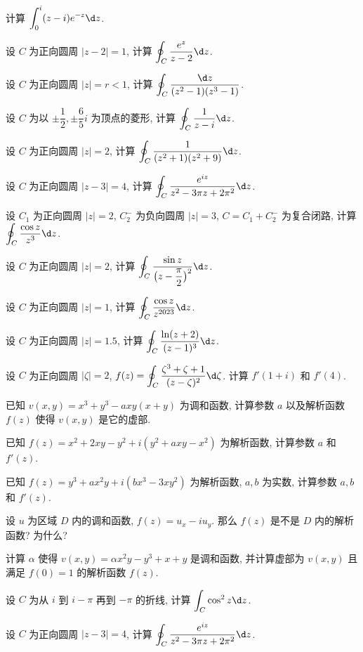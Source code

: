 \begin{homework}
\begin{subex}
    \item 计算 $\displaystyle\int_0^i(z-i)e^{-z}\d z$.
    \item 设 $C$ 为正向圆周 $|z-2|=1$, 计算 
      $\displaystyle\oint_C\frac{e^z}{z-2}\d z$.
    \item 设 $C$ 为正向圆周 $|z|=r<1$, 计算 
      $\displaystyle\oint_C\frac{\d z}{(z^2-1)(z^3-1)}$.
    \item 设 $C$ 为以 $\pm\dfrac12,\pm\dfrac65i$ 为顶点的菱形, 计算 
      $\displaystyle\oint_C\frac{1}{z-i}\d z$.
    \item 设 $C$ 为正向圆周 $|z|=2$, 计算 
      $\displaystyle\oint_C\frac1{(z^2+1)(z^2+9)}\d z$.
    \item 设 $C$ 为正向圆周 $|z-3|=4$, 计算 
      $\displaystyle\oint_C\frac{e^{iz}}{z^2-3\pi z+2\pi^2}\d z$.
    \item 设 $C_1$ 为正向圆周 $|z|=2$, $C_2^-$ 为负向圆周 $|z|=3$, $C=C_1+C_2^-$ 为复合闭路, 计算 
      $\displaystyle\oint_C\frac{\cos z}{z^3}\d z$.
    \item 设 $C$ 为正向圆周 $|z|=2$, 计算 
      $\displaystyle\oint_C\frac{\sin z}{\bigl(z-\dfrac\pi 2\bigr)^2}\d z$.
    \item 设 $C$ 为正向圆周 $|z|=1$, 计算 
      $\displaystyle\oint_C\frac{\cos z}{z^{2023}}\d z$.
    \item 设 $C$ 为正向圆周 $|z|=1.5$, 计算 
      $\displaystyle\oint_C\frac{\ln(z+2)}{(z-1)^3}\d z$.
    \item 设 $C$ 为正向圆周 $|\zeta|=2$, $\displaystyle f(z)=\oint_C\dfrac{\zeta^3+\zeta+1}{(z-\zeta)^2}\d\zeta$.
      计算 $f'(1+i)$ 和 $f'(4)$.
    \item 已知 $v(x,y)=x^3+y^3-axy(x+y)$ 为调和函数, 计算参数 $a$ 以及解析函数 $f(z)$ 使得 $v(x,y)$ 是它的虚部.
    \item 已知 $f(z)=x^2+2xy-y^2+i(y^2+axy-x^2)$ 为解析函数, 计算参数 $a$ 和 $f'(z)$.
    \item 已知 $f(z)=y^3+ax^2y+i(bx^3-3xy^2)$ 为解析函数, $a,b$ 为实数, 计算参数 $a,b$ 和 $f'(z)$.  
    \item 设 $u$ 为区域 $D$ 内的调和函数, $f(z)=u_x-iu_y$.
      那么 $f(z)$ 是不是 $D$ 内的解析函数? 为什么?
    \item 计算 $\alpha$ 使得 $v(x,y)=\alpha x^2y-y^3+x+y$ 是调和函数, 并计算虚部为 $v(x,y)$ 且满足 $f(0)=1$ 的解析函数 $f(z)$.
    \item 设 $C$ 为从 $i$ 到 $i-\pi$ 再到 $-\pi$ 的折线, 计算 $\displaystyle\int_C\cos^2z\d z$.
    \item 设 $C$ 为正向圆周 $|z-3|=4$, 计算 $\displaystyle\oint_C\frac{e^{iz}}{z^2-3\pi z+2\pi^2}\d z$.

\end{subex}
\end{homework}
